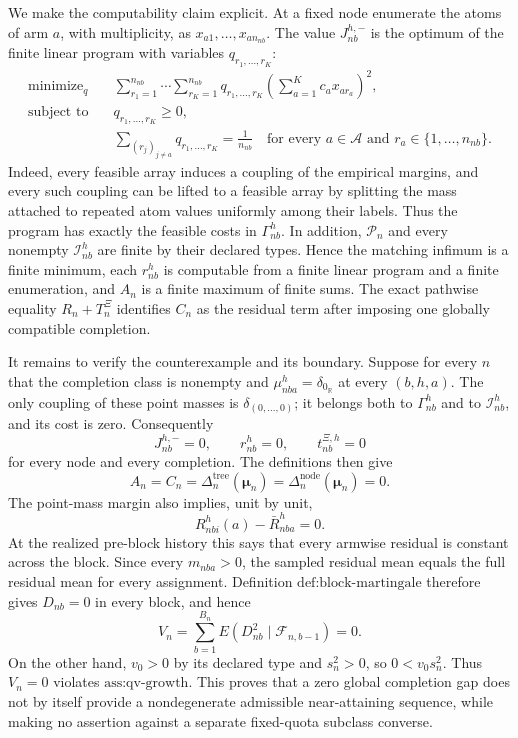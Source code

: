 We make the computability claim explicit.  At a fixed node enumerate the atoms of arm \(a\), with multiplicity, as \(x_{a1},\ldots,x_{a n_{nb}}\).  The value \(J_{nb}^{h,-}\) is the optimum of the finite linear program with variables \(q_{r_1,\ldots,r_K}\):
\[
\begin{aligned}
\operatorname{minimize}_{q}\quad
 &\sum_{r_1=1}^{n_{nb}}\cdots\sum_{r_K=1}^{n_{nb}}
 q_{r_1,\ldots,r_K}
 \left(\sum_{a=1}^{K}c_ax_{a r_a}\right)^2,\\
\operatorname{subject\ to}\quad
 &q_{r_1,\ldots,r_K}\ge0,\\
 &\sum_{(r_j)_{j\ne a}}q_{r_1,\ldots,r_K}=\frac1{n_{nb}}
 \quad\text{for every }a\in\mathcal A\text{ and }r_a\in\{1,\ldots,n_{nb}\}.
\end{aligned}
\]
Indeed, every feasible array induces a coupling of the empirical margins, and every such coupling can be lifted to a feasible array by splitting the mass attached to repeated atom values uniformly among their labels.  Thus the program has exactly the feasible costs in \(\Gamma_{nb}^{h}\).  In addition, \(\mathcal P_n\) and every nonempty \(\mathcal I_{nb}^{h}\) are finite by their declared types.  Hence the matching infimum is a finite minimum, each \(r_{nb}^{h}\) is computable from a finite linear program and a finite enumeration, and \(A_n\) is a finite maximum of finite sums.  The exact pathwise equality \(R_n+T_n^{\Xi}\) identifies \(C_n\) as the residual term after imposing one globally compatible completion.

It remains to verify the counterexample and its boundary.  Suppose for every \(n\) that the completion class is nonempty and \(\mu_{nba}^{h}=\delta_{0_{\mathbb R}}\) at every \((b,h,a)\).  The only coupling of these point masses is \(\delta_{(0,\ldots,0)}\); it belongs both to \(\Gamma_{nb}^{h}\) and to \(\mathcal I_{nb}^{h}\), and its cost is zero.  Consequently
\[
J_{nb}^{h,-}=0,
\qquad
r_{nb}^{h}=0,
\qquad
t_{nb}^{\Xi,h}=0
\]
for every node and every completion.  The definitions then give
\[
A_n=C_n=\Delta_n^{\mathrm{tree}}(\boldsymbol\mu_n)
=\Delta_n^{\mathrm{node}}(\boldsymbol\mu_n)=0.
\]
The point-mass margin also implies, unit by unit,
\[
R_{nbi}^{h}(a)-\bar R_{nba}^{h}=0.
\]
At the realized pre-block history this says that every armwise residual is constant across the block.  Since every \(m_{nba}>0\), the sampled residual mean equals the full residual mean for every assignment.  Definition \(\text{def:block-martingale}\) therefore gives \(D_{nb}=0\) in every block, and hence
\[
V_n=\sum_{b=1}^{B_n}E(D_{nb}^2\mid\mathcal F_{n,b-1})=0.
\]
On the other hand, \(v_0>0\) by its declared type and \(s_n^2>0\), so \(0<v_0s_n^2\).  Thus \(V_n=0\) violates \(\text{ass:qv-growth}\).  This proves that a zero global completion gap does not by itself provide a nondegenerate admissible near-attaining sequence, while making no assertion against a separate fixed-quota subclass converse.